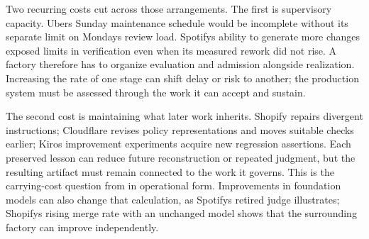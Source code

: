 
Two recurring costs cut across those arrangements. The first is supervisory capacity. Uber\textquotesingle s Sunday maintenance schedule would be incomplete without its separate limit on Monday\textquotesingle s review load. Spotify\textquotesingle s ability to generate more changes exposed limits in verification even when its measured rework did not rise. A factory therefore has to organize evaluation and admission alongside realization. Increasing the rate of one stage can shift delay or risk to another; the production system must be assessed through the work it can accept and sustain.


The second cost is maintaining what later work inherits. Shopify repairs divergent instructions; Cloudflare revises policy representations and moves suitable checks earlier; Kiro\textquotesingle s improvement experiments acquire new regression assertions. Each preserved lesson can reduce future reconstruction or repeated judgment, but the resulting artifact must remain connected to the work it governs. This is the carrying-cost question from  in operational form. Improvements in foundation models can also change that calculation, as Spotify\textquotesingle s retired judge illustrates; Shopify\textquotesingle s rising merge rate with an unchanged model shows that the surrounding factory can improve independently.
